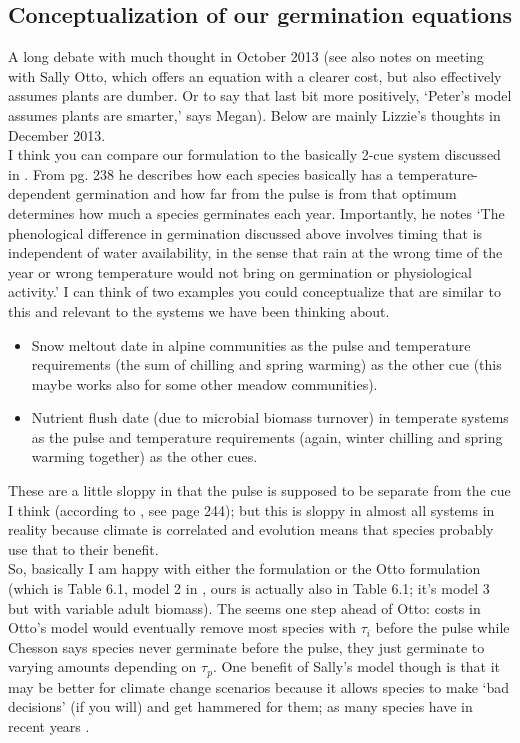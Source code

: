 \documentclass[11pt,a4paper,oneside]{article}
\begin{document}
\subsection{Conceptualization of our germination equations}
\noindent A long debate with much thought in October 2013 (see also notes on meeting with Sally Otto, which offers an equation with a clearer cost, but also effectively assumes plants are dumber. Or to say that last bit more positively, `Peter's model assumes plants are smarter,' says Megan). Below are mainly Lizzie's thoughts in December 2013. \\

I think you can compare our formulation to the basically 2-cue system discussed in \citet{Chesson:2004eo}. From pg. 238 he describes how each species basically has a temperature-dependent germination and how far from the pulse is from that optimum determines how much a species germinates each year. Importantly, he notes `The phenological difference in germination discussed
above involves timing that is independent of water
availability, in the sense that rain at the wrong time of
the year or wrong temperature would not bring on
germination or physiological activity.' I can think of two examples you could conceptualize that are similar to this and relevant to the systems we have been thinking about.
\begin{itemize}
\item Snow meltout date in alpine communities as the pulse and temperature requirements (the sum of chilling and spring warming) as the other cue (this maybe works also for some other meadow communities).
\item Nutrient flush date (due to microbial biomass turnover) in temperate systems as the pulse and temperature requirements (again, winter chilling and spring warming together) as the other cues. 
\end{itemize}
These are a little sloppy in that the pulse is supposed to be separate from the cue I think (according to \citet{Chesson:2004eo}, see page 244); but this is sloppy in almost all systems in reality because climate is correlated and evolution means that species probably use that to their benefit.\\

\noindent So, basically I am happy with either the \citet{Chesson:2004eo} formulation or the Otto formulation (which is Table 6.1, model 2 in \cite{chesson2008}, ours is actually also in Table 6.1; it's model 3 but with variable adult biomass). The \citet{Chesson:2004eo} seems one step ahead of Otto: costs in Otto's model would eventually remove most species with \(\tau_{i}\) before the pulse while Chesson says species never germinate before the pulse, they just germinate to varying amounts depending on \(\tau_{p}\).  One benefit of Sally's model though is that it may be better for climate change scenarios because it allows species to make `bad decisions' (if you will) and get hammered for them; as many species have in recent years \citep[e.g.,][]{Inouye:2008gj}.\\
\end{document}
